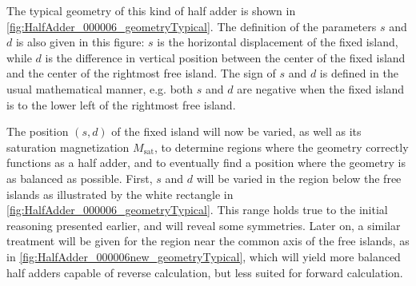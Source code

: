 \documentclass[11pt,a4paper,english]{article}
\begin{document}
The typical geometry of this kind of half adder is shown in \cref{fig:HalfAdder_000006_geometryTypical}. The definition of the parameters $s$ and $d$ is also given in this figure: $s$ is the horizontal displacement of the fixed island, while $d$ is the difference in vertical position between the center of the fixed island and the center of the rightmost free island. The sign of $s$ and $d$ is defined in the usual mathematical manner, e.g. both $s$ and $d$ are negative when the fixed island is to the lower left of the rightmost free island. \par 
The position $(s,d)$ of the fixed island will now be varied, as well as its saturation magnetization $M_\mathrm{sat}$, to determine regions where the geometry correctly functions as a half adder, and to eventually find a position where the geometry is as balanced as possible. First, $s$ and $d$ will be varied in the region below the free islands as illustrated by the white rectangle in \cref{fig:HalfAdder_000006_geometryTypical}. This range holds true to the initial reasoning presented earlier, and will reveal some symmetries. Later on, a similar treatment will be given for the region near the common axis of the free islands, as in \cref{fig:HalfAdder_000006new_geometryTypical}, which will yield more balanced half adders capable of reverse calculation, but less suited for forward calculation.
\end{document}
